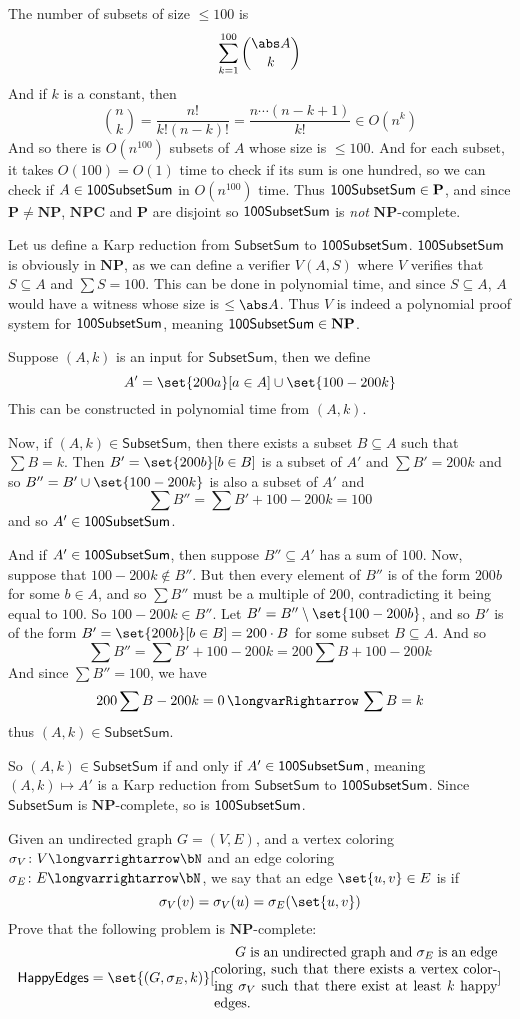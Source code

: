 \documentclass[10pt]{article}
\def\implies{\,\longvarRightarrow\,}
\let\longto=\longvarrightarrow
\def\subsum{\mathsf{SubsetSum}}
\def\P{\mathbf{P}}
\def\NP{\mathbf{NP}}
\def\NPC{\mathbf{NPC}}
\begin{document}
    The number of subsets of size $\leq100$ is
    \[ \sum_{k=1}^{100}\binom{\abs A}k \]
    And if $k$ is a constant, then
    \[ \binom{n}{k} = \frac{n!}{k!(n-k)!} = \frac{n\cdots(n-k+1)}{k!} \in O(n^k) \]
    And so there is $O(n^{100})$ subsets of $A$ whose size is $\leq100$.
    And for each subset, it takes $O(100)=O(1)$ time to check if its sum is one hundred, so we can check if $A\in\textsf{100SubsetSum}$ in $O(n^{100})$ time.
    Thus $\hsubsum\in\P$, and since $\P\neq\NP$, $\NPC$ and $\P$ are disjoint so $\textsf{100SubsetSum}$ is \emph{not} $\NP$-complete.

    \item Let us define a Karp reduction from $\subsum$ to $\textsf{100SubsetSum}$.
    $\textsf{100SubsetSum}$ is obviously in $\NP$, as we can define a verifier $V(A,S)$ where $V$ verifies that $S\subseteq A$ and $\sum S=100$.
    This can be done in polynomial time, and since $S\subseteq A$, $A$ would have a witness whose size is $\leq\abs A$.
    Thus $V$ is indeed a polynomial proof system for $\textsf{100SubsetSum}$, meaning $\hsubsum\in\NP$.

    Suppose $(A,k)$ is an input for $\subsum$, then we define
    \[ A' = \set{200a}[a\in A]\cup\set{100-200k} \]
    This can be constructed in polynomial time from $(A,k)$.

    Now, if $(A,k)\in\subsum$, then there exists a subset $B\subseteq A$ such that $\sum B=k$.
    Then $B'=\set{200b}[b\in B]$ is a subset of $A'$ and $\sum B'=200k$ and so $B''=B'\cup\set{100-200k}$ is also a subset of $A'$ and
    \[ \sum B'' = \sum B' + 100 - 200k = 100 \]
    and so $A'\in\textsf{100SubsetSum}$.

    And if $A'\in\textsf{100SubsetSum}$, then suppose $B''\subseteq A'$ has a sum of $100$.
    Now, suppose that $100-200k\notin B''$.
    But then every element of $B''$ is of the form $200b$ for some $b\in A$, and so $\sum B''$ must be a multiple of $200$, contradicting it being equal to $100$.
    So $100-200k\in B''$.
    Let $B'=B''\setminus\set{100-200b}$, and so $B'$ is of the form $B'=\set{200b}[b\in B]=200\cdot B$ for some subset $B\subseteq A$.
    And so
    \[ \sum B'' = \sum B' + 100-200k = 200\sum B + 100-200k \]
    And since $\sum B''=100$, we have
    \[ 200\sum B - 200k = 0 \implies \sum B = k \]
    thus $(A,k)\in\subsum$.

    So $(A,k)\in\subsum$ if and only if $A'\in\textsf{100SubsetSum}$, meaning $(A,k)\mapsto A'$ is a Karp reduction from $\subsum$ to $\textsf{100SubsetSum}$.
    Since $\subsum$ is $\NP$-complete, so is $\textsf{100SubsetSum}$.
\eenum

\def\happyedges{\mathsf{HappyEdges}}
\begin{exercise*}

    Given an undirected graph $G=(V,E)$, and a vertex coloring $\sigma_V\colon V\longto\bN$ and an edge coloring $\sigma_E\colon E\longto\bN$, we say that an edge $\set{u,v}\in E$ is  if
    \[ \sigma_V(v) = \sigma_V(u) = \sigma_E(\set{u,v}) \]
    Prove that the following problem is $\NP$-complete:
    \[ \happyedges = \set{(G,\sigma_E,k)}[\vcenter{\advance\hsize by-5cm
    $G$ is an undirected graph and $\sigma_E$ is an edge coloring, such that there exists a vertex coloring $\sigma_V$ such that there exist at least $k$ happy edges.}] \]

\end{exercise*}
\end{document}
